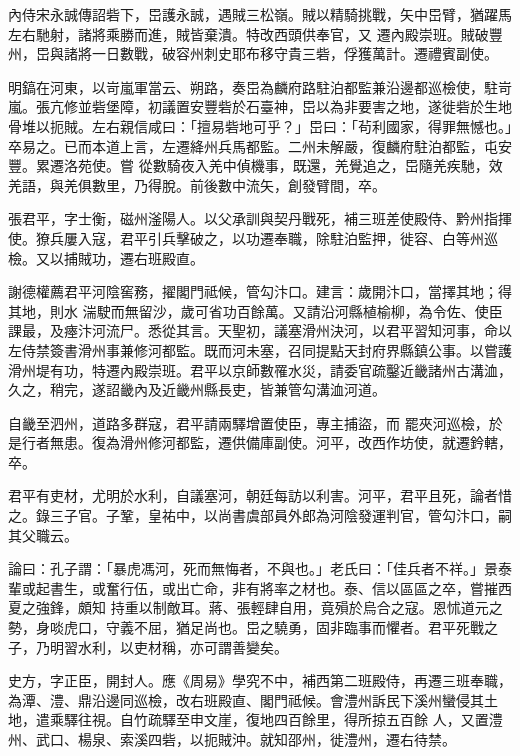 \begin{pinyinscope}
 內侍宋永誠傳詔砦下，岊護永誠，遇賊三松嶺。賊以精騎挑戰，矢中岊臂，猶躍馬左右馳射，諸將乘勝而進，賊皆棄潰。特改西頭供奉官，又
 遷內殿崇班。賊破豐州，岊與諸將一日數戰，破容州刺史耶布移守貴三砦，俘獲萬計。遷禮賓副使。



 明鎬在河東，以岢嵐軍當云、朔路，奏岊為麟府路駐泊都監兼沿邊都巡檢使，駐岢嵐。張亢修並砦堡障，初議置安豐砦於石臺神，岊以為非要害之地，遂徙砦於生地骨堆以扼賊。左右親信咸曰：「擅易砦地可乎？」岊曰：「茍利國家，得罪無憾也。」卒易之。已而本道上言，左遷絳州兵馬都監。二州未解嚴，復麟府駐泊都監，屯安豐。累遷洛苑使。嘗
 從數騎夜入羌中偵機事，既還，羌覺追之，岊隨羌疾馳，效羌語，與羌俱數里，乃得脫。前後數中流矢，創發臂間，卒。



 張君平，字士衡，磁州滏陽人。以父承訓與契丹戰死，補三班差使殿侍、黔州指揮使。獠兵屢入寇，君平引兵擊破之，以功遷奉職，除駐泊監押，徙容、白等州巡檢。又以捕賊功，遷右班殿直。



 謝德權薦君平河陰窖務，擢閣門祗候，管勾汴口。建言：歲開汴口，當擇其地；得其地，則水
 湍駛而無留沙，歲可省功百餘萬。又請沿河縣植榆柳，為令佐、使臣課最，及瘞汴河流尸。悉從其言。天聖初，議塞滑州決河，以君平習知河事，命以左侍禁簽書滑州事兼修河都監。既而河未塞，召同提點天封府界縣鎮公事。以嘗護滑州堤有功，特遷內殿崇班。君平以京師數罹水災，請委官疏鑿近畿諸州古溝洫，久之，稍完，遂詔畿內及近畿州縣長吏，皆兼管勾溝洫河道。



 自畿至泗州，道路多群寇，君平請兩驛增置使臣，專主捕盜，而
 罷夾河巡檢，於是行者無患。復為滑州修河都監，遷供備庫副使。河平，改西作坊使，就遷鈐轄，卒。



 君平有吏材，尤明於水利，自議塞河，朝廷每訪以利害。河平，君平且死，論者惜之。錄三子官。子鞏，皇祐中，以尚書虞部員外郎為河陰發運判官，管勾汴口，嗣其父職云。



 論曰：孔子謂：「暴虎馮河，死而無悔者，不與也。」老氏曰：「佳兵者不祥。」景泰輩或起書生，或奮行伍，或出亡命，非有將率之材也。泰、信以區區之卒，嘗摧西夏之強鋒，頗知
 持重以制敵耳。蔣、張輕肆自用，竟殞於烏合之寇。恩怵道元之勢，身啖虎口，守義不屈，猶足尚也。岊之驍勇，固非臨事而懼者。君平死戰之子，乃明習水利，以吏材稱，亦可謂善變矣。



 史方，字正臣，開封人。應《周易》學究不中，補西第二班殿侍，再遷三班奉職，為潭、澧、鼎沿邊同巡檢，改右班殿直、閣門祗候。會澧州訴民下溪州蠻侵其土地，遣乘驛往視。自竹疏驛至申文崖，復地四百餘里，得所掠五百餘
 人，又置澧州、武口、楊泉、索溪四砦，以扼賊沖。就知邵州，徙澧州，遷右待禁。




\end{pinyinscope}
